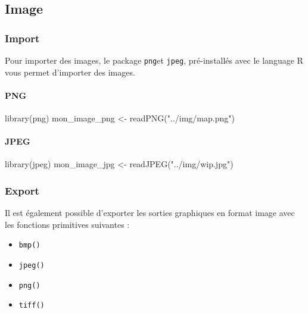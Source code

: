 \documentclass[
  letterpaper,
  DIV=11,
  numbers=noendperiod]{scrartcl}
\let\oldparagraph\paragraph
\renewcommand{\paragraph}[1]{\oldparagraph{#1}\mbox{}}
\newenvironment{Shaded}{\begin{snugshade}}{\end{snugshade}}
\newcommand{\FunctionTok}[1]{\textcolor[rgb]{0.28,0.35,0.67}{#1}}
\newcommand{\NormalTok}[1]{\textcolor[rgb]{0.00,0.23,0.31}{#1}}
\newcommand{\OtherTok}[1]{\textcolor[rgb]{0.00,0.23,0.31}{#1}}
\newcommand{\StringTok}[1]{\textcolor[rgb]{0.13,0.47,0.30}{#1}}
\providecommand{\tightlist}{%
  \setlength{\itemsep}{0pt}\setlength{\parskip}{0pt}}\usepackage{longtable,booktabs,array}
\begin{document}
\hfill\break

\hypertarget{image}{%
\subsection{\texorpdfstring{\textbf{Image}}{Image}}\label{image}}

\hypertarget{import-4}{%
\subsubsection{Import}\label{import-4}}

Pour importer des images, le package \texttt{png}et \texttt{jpeg},
pré-installés avec le language R vous permet d'importer des images.

\hypertarget{png}{%
\paragraph{PNG}\label{png}}

\begin{Shaded}
\begin{Highlighting}[]
\FunctionTok{library}\NormalTok{(png)}
\NormalTok{mon\_image\_png }\OtherTok{\textless{}{-}} \FunctionTok{readPNG}\NormalTok{(}\StringTok{"../img/map.png"}\NormalTok{)}
\end{Highlighting}
\end{Shaded}

\hypertarget{jpeg}{%
\paragraph{JPEG}\label{jpeg}}

\begin{Shaded}
\begin{Highlighting}[]
\FunctionTok{library}\NormalTok{(jpeg)}
\NormalTok{mon\_image\_jpg }\OtherTok{\textless{}{-}} \FunctionTok{readJPEG}\NormalTok{(}\StringTok{"../img/wip.jpg"}\NormalTok{)}
\end{Highlighting}
\end{Shaded}

\hypertarget{export-4}{%
\subsubsection{Export}\label{export-4}}

Il est également possible d'exporter les sorties graphiques en format
image avec les fonctions primitives suivantes :

\begin{itemize}
\tightlist
\item
  \texttt{bmp()}
\item
  \texttt{jpeg()}
\item
  \texttt{png()}
\item
  \texttt{tiff()}
\end{itemize}
\end{document}
